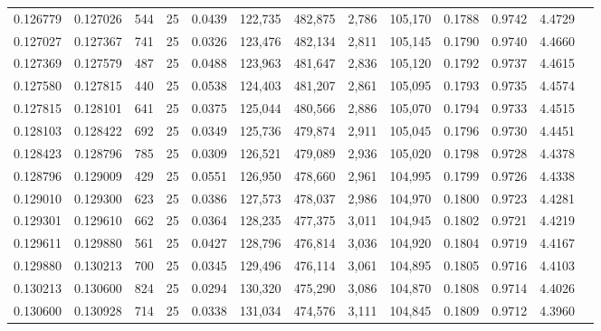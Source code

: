 \begin{tabular}{rrrrrrrrrrrrr}
0.126779 & 0.127026 &   544 &  25 &                                     0.0439 & 122,735 & 482,875 &   2,786 & 105,170 & 0.1788 & 0.9742 & 4.4729 \\
0.127027 & 0.127367 &   741 &  25 &                                     0.0326 & 123,476 & 482,134 &   2,811 & 105,145 & 0.1790 & 0.9740 & 4.4660 \\
0.127369 & 0.127579 &   487 &  25 &                                     0.0488 & 123,963 & 481,647 &   2,836 & 105,120 & 0.1792 & 0.9737 & 4.4615 \\
0.127580 & 0.127815 &   440 &  25 &                                     0.0538 & 124,403 & 481,207 &   2,861 & 105,095 & 0.1793 & 0.9735 & 4.4574 \\
0.127815 & 0.128101 &   641 &  25 &                                     0.0375 & 125,044 & 480,566 &   2,886 & 105,070 & 0.1794 & 0.9733 & 4.4515 \\
0.128103 & 0.128422 &   692 &  25 &                                     0.0349 & 125,736 & 479,874 &   2,911 & 105,045 & 0.1796 & 0.9730 & 4.4451 \\
0.128423 & 0.128796 &   785 &  25 &                                     0.0309 & 126,521 & 479,089 &   2,936 & 105,020 & 0.1798 & 0.9728 & 4.4378 \\
0.128796 & 0.129009 &   429 &  25 &                                     0.0551 & 126,950 & 478,660 &   2,961 & 104,995 & 0.1799 & 0.9726 & 4.4338 \\
0.129010 & 0.129300 &   623 &  25 &                                     0.0386 & 127,573 & 478,037 &   2,986 & 104,970 & 0.1800 & 0.9723 & 4.4281 \\
0.129301 & 0.129610 &   662 &  25 &                                     0.0364 & 128,235 & 477,375 &   3,011 & 104,945 & 0.1802 & 0.9721 & 4.4219 \\
0.129611 & 0.129880 &   561 &  25 &                                     0.0427 & 128,796 & 476,814 &   3,036 & 104,920 & 0.1804 & 0.9719 & 4.4167 \\
0.129880 & 0.130213 &   700 &  25 &                                     0.0345 & 129,496 & 476,114 &   3,061 & 104,895 & 0.1805 & 0.9716 & 4.4103 \\
0.130213 & 0.130600 &   824 &  25 &                                     0.0294 & 130,320 & 475,290 &   3,086 & 104,870 & 0.1808 & 0.9714 & 4.4026 \\
0.130600 & 0.130928 &   714 &  25 &                                     0.0338 & 131,034 & 474,576 &   3,111 & 104,845 & 0.1809 & 0.9712 & 4.3960 \\

\end{tabular}

